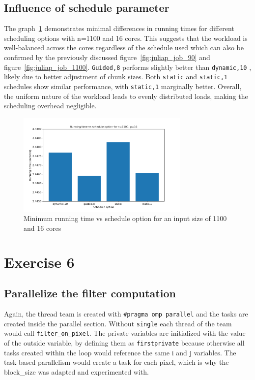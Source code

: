 \documentclass[a4paper,%
7pt,%
DIV12,
headsepline,%
headings=normal,
]{scrartcl}
\begin{document}
\subsection{Influence of schedule parameter}

The graph~\ref{fig:juliap2_job} demonstrates minimal differences in running times for different scheduling options with n=1100 and 16 cores. This suggests that the workload is well-balanced across the cores regardless of the schedule used which can also be confirmed by the previously discussed figure~\ref{fig:juliap_job_90} and figure~\ref{fig:juliap_job_1100}.  \texttt{Guided,8} performs slightly better than \texttt{dynamic,10} , likely due to better adjustment of chunk sizes. Both \texttt{static} and \texttt{static,1} schedules show similar performance, with \texttt{static,1} marginally better. Overall, the uniform nature of the workload leads to evenly distributed loads, making the scheduling overhead negligible.

\begin{figure}[htbp]
    \centering
    \includegraphics[width=0.75\textwidth]{./juliap2_job.png}
    \caption{Minimum running time vs schedule option for an input size of 1100 and 16 cores}
    \label{fig:juliap2_job}
\end{figure}


\section{Exercise 6}

\subsection{Parallelize the filter computation}

Again, the thread team is created with \texttt{\#pragma omp parallel} and the tasks are created inside the parallel section. Without \texttt{single} each thread of the team would call \texttt{filter\_on\_pixel}. 
The private variables are initialized with the value of the outside variable, by defining them as \texttt{firstprivate} because otherwise all tasks created within the loop would reference the same i and j variables. The task-based parallelism would create a task for each pixel, which is why the block\_size was adapted and experimented with.
\end{document}
